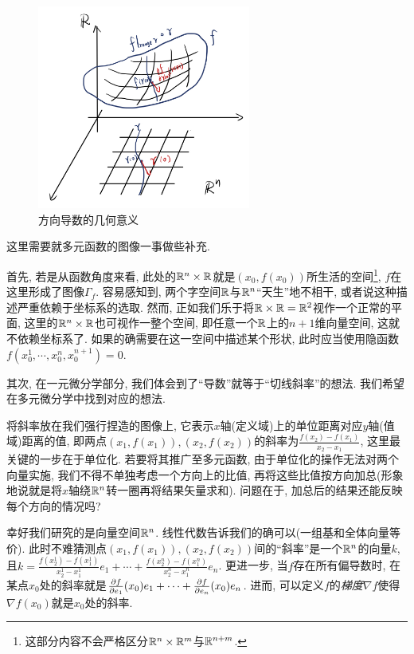\begin{figure}[H]
	\centering
	\includegraphics[width=7cm]{attachment/IMG_3923.jpg}
	\caption{方向导数的几何意义}
\end{figure}

这里需要就多元函数的图像一事做些补充. 

首先, 若是从函数角度来看, 此处的$\mathbb{R} ^n \times \mathbb{R}$就是$(x_0,f(x_0))$所生活的空间\footnote{这部分内容不会严格区分$\mathbb{R} ^n \times \mathbb{R} ^m$与$\mathbb{R} ^{n+m}$. }, $f$在这里形成了图像$\Gamma _f$. 容易感知到, 两个字空间$\mathbb{R}$与$\mathbb{R} ^n$“天生”地不相干, 或者说这种描述严重依赖于坐标系的选取. 然而, 正如我们乐于将$\mathbb{R} \times \mathbb{R} = \mathbb{R} ^2$视作一个正常的平面, 这里的$\mathbb{R} ^n \times \mathbb{R}$也可视作一整个空间, 即任意一个$\mathbb{R}$上的$n+1$维向量空间, 这就不依赖坐标系了. 如果的确需要在这一空间中描述某个形状, 此时应当使用隐函数$f(x_0^1,\cdots ,x_0^n,x_0^{n+1})=0$. 

其次, 在一元微分学部分, 我们体会到了“导数”就等于“切线斜率”的想法. 我们希望在多元微分学中找到对应的想法. 

将斜率放在我们强行捏造的图像上, 它表示$x$轴(定义域)上的单位距离对应$y$轴(值域)距离的值, 即两点$(x_1,f(x_1)),(x_2,f(x_2))$的斜率为$\frac{f(x_2)-f(x_1)}{x_2-x_1}$, 这里最关键的一步在于单位化. 若要将其推广至多元函数, 由于单位化的操作无法对两个向量实施, 我们不得不单独考虑一个方向上的比值, 再将这些比值按方向加总(形象地说就是将$x$轴绕$\mathbb{R} ^n$转一圈再将结果矢量求和). 问题在于, 加总后的结果还能反映每个方向的情况吗? 

幸好我们研究的是向量空间$\mathbb{R} ^n$. 线性代数告诉我们的确可以(一组基和全体向量等价). 此时不难猜测点$(x_1,f(x_1)),(x_2,f(x_2))$间的“斜率”是一个$\mathbb{R} ^n$的向量$k$, 且$k= \frac{f(x_2^1)-f(x_1^1)}{x_2^1-x_1^1}e_1 + \cdots + \frac{f(x_2^n)-f(x_1^n)}{x_2^n-x_1^n}e_n$. 更进一步, 当$f$存在所有偏导数时, 在某点$x_0$处的斜率就是$\frac{\partial f}{\partial e_1}(x_0)e_1 + \cdots + \frac{\partial f}{\partial e_n}(x_0)e_n$. 进而, 可以定义$f$的\textit{梯度}$\nabla f$使得$\nabla f(x_0)$就是$x_0$处的斜率. 


